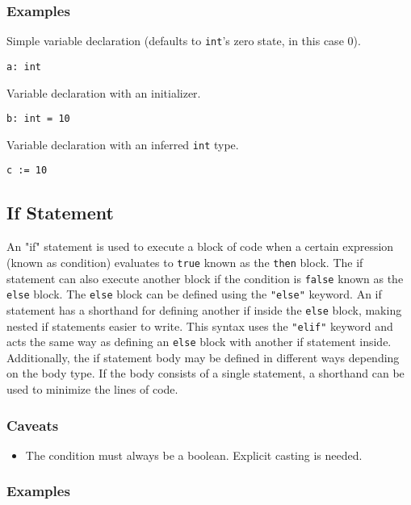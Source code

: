 \subsubsection{Examples}

Simple variable declaration (defaults to \texttt{int}'s zero state, in this case 0).
\begin{lstlisting}
a: int
\end{lstlisting}
Variable declaration with an initializer.
\begin{lstlisting}
b: int = 10
\end{lstlisting}
Variable declaration with an inferred \texttt{int} type.
\begin{lstlisting}
c := 10
\end{lstlisting}

\subsection{If Statement}

An "if" statement is used to execute a block of code when a certain expression (known as condition) evaluates to \texttt{true} known as the \texttt{then} block.
The if statement can also execute another block if the condition is \texttt{false} known as the \texttt{else} block.
The \texttt{else} block can be defined using the \texttt{"else"} keyword.
An if statement has a shorthand for defining another if inside the \texttt{else} block, making nested if statements easier to write.
This syntax uses the \texttt{"elif"} keyword and acts the same way as defining an \texttt{else} block with another if statement inside.
Additionally, the if statement body may be defined in different ways depending on the body type. If the body consists of a single statement,
a shorthand can be used to minimize the lines of code.

\subsubsection{Caveats}

\begin{itemize}
    \item The condition must always be a boolean. Explicit casting is needed.
\end{itemize}

\subsubsection{Examples}

